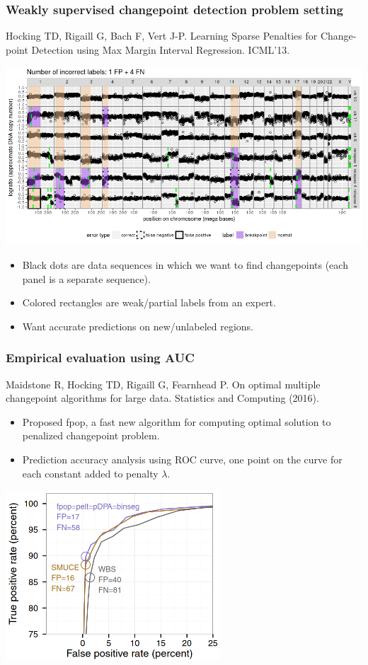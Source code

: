 \documentclass[t]{beamer}
\DeclareMathOperator*{\argmin}{arg\,min}
\begin{document}
\begin{frame}
  \frametitle{Weakly supervised changepoint detection problem setting}

  {\scriptsize Hocking TD, Rigaill G, Bach F, Vert J-P. Learning Sparse Penalties
  for Change-point Detection using Max Margin Interval
  Regression. ICML'13.}

  \includegraphics[width=\textwidth]{neuroblastoma-ok-relapse-supervised}

  \begin{itemize}
  \item Black dots are data sequences in which we want to find
    changepoints (each panel is a separate sequence).
  \item Colored rectangles are weak/partial labels from an expert.
  \item Want accurate predictions on new/unlabeled regions.
  \end{itemize}
\end{frame}

\begin{frame}
  \frametitle{Empirical evaluation using AUC}

  {\scriptsize Maidstone R, Hocking TD, Rigaill G, Fearnhead P. On optimal multiple
  changepoint algorithms for large data. Statistics and Computing
  (2016).}

  \begin{itemize}
  \item Proposed fpop, a fast new algorithm for computing optimal solution to
    penalized changepoint problem.
\item Prediction accuracy analysis using ROC curve, one point on the curve for each constant added to penalty $\lambda$.
  \end{itemize}

  \includegraphics[width=0.6\textwidth]{figure-Maidstone-roc}
\end{frame}
\end{document}
